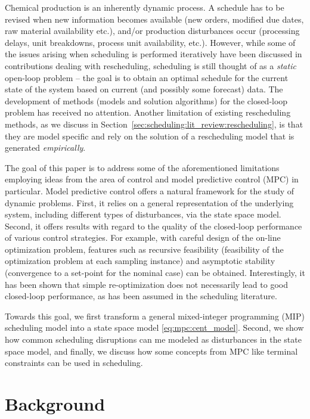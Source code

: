 Chemical production is an inherently dynamic process. A schedule has
to be revised when new information becomes available (new orders,
modified due dates, raw material availability etc.), and/or production
disturbances occur (\eg processing delays, unit breakdowns, process
unit availability, etc.). However, while some of the issues arising when scheduling is
performed iteratively have been discussed in contributions dealing
with rescheduling, scheduling is still thought of as a {\em{static}}
open-loop problem -- the goal is to obtain an optimal schedule for the
current state of the system based on current (and possibly some
forecast) data. The development of methods (models and solution
algorithms) for the closed-loop problem has received no
attention. Another limitation of existing rescheduling methods, as we
discuss in Section~\ref{sec:scheduling:lit_review:rescheduling}, is that they are
model specific and rely on the solution of a rescheduling model that
is generated  {\em{empirically}}.

The goal of this paper is to address some of the aforementioned
limitations employing ideas from the area of control and model
predictive control (MPC) in particular. Model predictive control
offers a natural framework for the study of dynamic problems. First,
it relies on a general representation of the underlying system,
including different types of disturbances, via the state space
model. Second, it offers results with regard to the quality of the
closed-loop performance of various control strategies. For example,
with careful design of the on-line optimization problem, features such
as recursive feasibility (feasibility of the optimization problem at
each sampling instance) and asymptotic stability (convergence to a
set-point for the nominal case) can be obtained. Interestingly, it has
been shown that simple re-optimization does not necessarily lead to
good closed-loop performance, as has been assumed in the scheduling
literature.

Towards this goal, we first transform a general
mixed-integer programming (MIP) scheduling model into a state space
model \eqref{eq:mpc:cent_model}. Second, we show how common scheduling
disruptions can me modeled as disturbances in the state space model,
and finally, we discuss how some concepts from MPC like terminal
constraints can be used in scheduling. 


\section{Background}
\label{sec:scheduling:lit_review}

